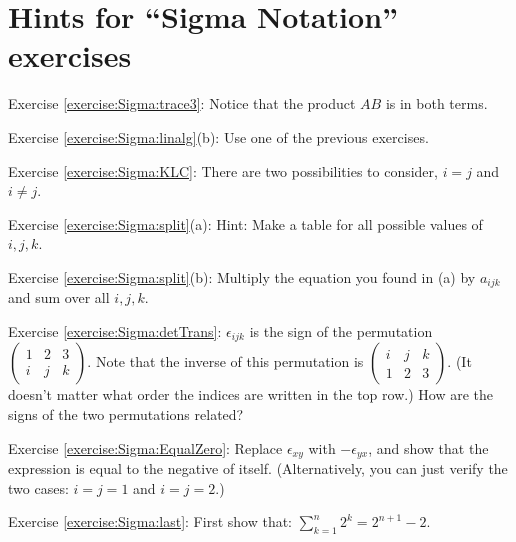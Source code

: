 \section{Hints for ``Sigma Notation'' exercises}\label{sec:sigma:hints} 


\noindent Exercise \ref{exercise:Sigma:trace3}: Notice that the product ${AB}$ is in both terms.

\noindent Exercise \ref{exercise:Sigma:linalg}(b): Use one of the previous exercises.

\noindent Exercise \ref{exercise:Sigma:KLC}: There are two possibilities to consider, $i=j$ and $i \neq j$.

\noindent Exercise \ref{exercise:Sigma:split}(a): Hint: Make a table for all possible values of $i,j,k$.

\noindent Exercise \ref{exercise:Sigma:split}(b): Multiply the equation you found in (a) by $a_{ijk}$ and sum over all $i,j,k$.


\noindent Exercise \ref{exercise:Sigma:detTrans}: $\epsilon_{ijk}$ is the sign of the permutation $\left( \begin{smallmatrix}  1 & 2 & 3  \\ i & j & k  \end{smallmatrix} \right)$. Note that the inverse of this permutation is $ \left( \begin{smallmatrix}  i & j & k  \\ 1 & 2 & 3  \end{smallmatrix} \right)$.  (It doesn't matter what order the indices are written in the top row.) How are the signs of the two permutations related? 


\noindent Exercise \ref{exercise:Sigma:EqualZero}: Replace $\epsilon_{xy}$ with $-\epsilon_{yx}$, and show that the expression is equal to the negative of itself. (Alternatively, you can just verify the two cases:  $i=j=1$ and $i=j=2$.)


\noindent Exercise \ref{exercise:Sigma:last}: First show that:  $\sum_{k=1}^n 2^k = 2^{n+1} - 2$.
